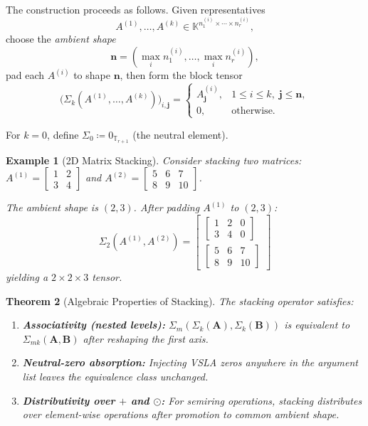 \documentclass[11pt]{article}
\newtheorem{theorem}{Theorem}[section]
\newtheorem{example}[theorem]{Example}
\begin{document}
The construction proceeds as follows. Given representatives
\[
A^{(1)}, \ldots, A^{(k)} \in \mathbb{K}^{n_1^{(i)} \times \cdots \times n_r^{(i)}},
\]
choose the \emph{ambient shape}
\[
\mathbf{n} = \left(\max_i n_1^{(i)}, \ldots, \max_i n_r^{(i)}\right),
\]
pad each $A^{(i)}$ to shape $\mathbf{n}$, then form the block tensor
\[
\bigl(\Sigma_k(A^{(1)}, \ldots, A^{(k)})\bigr)_{i,\mathbf{j}} = 
\begin{cases}
A^{(i)}_{\mathbf{j}}, & 1 \leq i \leq k, \; \mathbf{j} \leq \mathbf{n}, \\
0, & \text{otherwise}.
\end{cases}
\]

For $k = 0$, define $\Sigma_0 \coloneqq 0_{\mathbb{T}_{r+1}}$ (the neutral element).

\begin{example}[2D Matrix Stacking]
Consider stacking two matrices: $A^{(1)} = \begin{bmatrix} 1 & 2 \\ 3 & 4 \end{bmatrix}$ and $A^{(2)} = \begin{bmatrix} 5 & 6 & 7 \\ 8 & 9 & 10 \end{bmatrix}$.

The ambient shape is $(2, 3)$. After padding $A^{(1)}$ to $(2, 3)$:
\[
\Sigma_2(A^{(1)}, A^{(2)}) = \begin{bmatrix}
\begin{bmatrix} 1 & 2 & 0 \\ 3 & 4 & 0 \end{bmatrix} \\[0.5em]
\begin{bmatrix} 5 & 6 & 7 \\ 8 & 9 & 10 \end{bmatrix}
\end{bmatrix}
\]
yielding a $2 \times 2 \times 3$ tensor.
\end{example}

\begin{theorem}[Algebraic Properties of Stacking]
\label{thm:stacking-properties}
The stacking operator satisfies:
\begin{enumerate}
\item \textbf{Associativity (nested levels):} $\Sigma_m(\Sigma_k(\mathbf{A}), \Sigma_k(\mathbf{B}))$ is equivalent to $\Sigma_{mk}(\mathbf{A}, \mathbf{B})$ after reshaping the first axis.
\item \textbf{Neutral-zero absorption:} Injecting VSLA zeros anywhere in the argument list leaves the equivalence class unchanged.
\item \textbf{Distributivity over $+$ and $\odot$:} For semiring operations, stacking distributes over element-wise operations after promotion to common ambient shape.
\end{enumerate}
\end{theorem}
\end{document}
